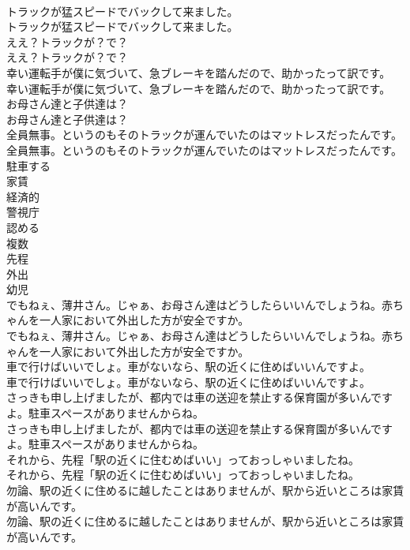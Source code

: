 \documentclass[8pt]{extreport}
\begin{document}
\begin{CJK}{UTF8}{min}
\\	トラックが猛スピードでバックして来ました。	
\\	トラックが猛スピードでバックして来ました。 
\\	ええ？トラックが？で？	
\\	ええ？トラックが？で？ 
\\	幸い運転手が僕に気づいて、急ブレーキを踏んだので、助かったって訳です。	
\\	幸い運転手が僕に気づいて、急ブレーキを踏んだので、助かったって訳です。 
\\	お母さん達と子供達は？	
\\	お母さん達と子供達は？ 
\\	全員無事。というのもそのトラックが運んでいたのはマットレスだったんです。	
\\	全員無事。というのもそのトラックが運んでいたのはマットレスだったんです。 
\\	駐車する
\\	家賃
\\	経済的
\\	警視庁
\\	認める
\\	複数
\\	先程
\\	外出
\\	幼児
\\	でもねぇ、薄井さん。じゃぁ、お母さん達はどうしたらいいんでしょうね。赤ちゃんを一人家において外出した方が安全ですか。	
\\	でもねぇ、薄井さん。じゃぁ、お母さん達はどうしたらいいんでしょうね。赤ちゃんを一人家において外出した方が安全ですか。 
\\	車で行けばいいでしょ。車がないなら、駅の近くに住めばいいんですよ。	
\\	車で行けばいいでしょ。車がないなら、駅の近くに住めばいいんですよ。 
\\	さっきも申し上げましたが、都内では車の送迎を禁止する保育園が多いんですよ。駐車スペースがありませんからね。	
\\	さっきも申し上げましたが、都内では車の送迎を禁止する保育園が多いんですよ。駐車スペースがありませんからね。 
\\	それから、先程「駅の近くに住むめばいい」っておっしゃいましたね。	
\\	それから、先程「駅の近くに住むめばいい」っておっしゃいましたね。 
\\	勿論、駅の近くに住めるに越したことはありませんが、駅から近いところは家賃が高いんです。	
\\	勿論、駅の近くに住めるに越したことはありませんが、駅から近いところは家賃が高いんです。 

\end{CJK}
\end{document}
